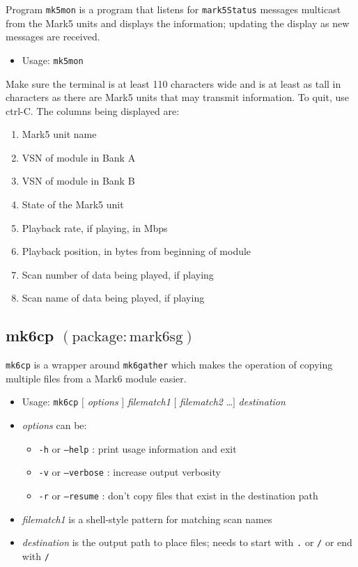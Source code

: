 Program {\tt mk5mon} is a program that listens for {\tt mark5Status} messages multicast from the Mark5 units and displays the information; updating the display as new messages are received.

\begin{itemize}
\item[] Usage: {\tt mk5mon}
\end{itemize}

Make sure the terminal is at least 110 characters wide and is at least as tall in characters as there are Mark5 units that may transmit information.
To quit, use ctrl-C.
The columns being displayed are:
\begin{enumerate}
\item Mark5 unit name
\item VSN of module in Bank A
\item VSN of module in Bank B
\item State of the Mark5 unit
\item Playback rate, if playing, in Mbps
\item Playback position, in bytes from beginning of module
\item Scan number of data being played, if playing
\item Scan name of data being played, if playing
\end{enumerate}




\subsection{mk6cp {\small $\mathrm{(package: mark6sg)}$} \label{sec:mk6cp}}

{\tt mk6cp} is a wrapper around {\tt mk6gather} which makes the operation of copying multiple files from a Mark6 module easier.

\begin{itemize}
\item[] Usage: {\tt mk6cp} $[$ {\em options} $]$ {\em filematch1} $[$ {\em filematch2} \ldots $]$ {\em destination}
\item[] {\em options} can be:
\begin{itemize}
\item[] {\tt -h} or {\tt --help} : print usage information and exit
\item[] {\tt -v} or {\tt --verbose} : increase output verbosity
\item[] {\tt -r} or {\tt --resume} : don't copy files that exist in the destination path
\end{itemize}
\item[] {\em filematch1} is a shell-style pattern for matching scan names
\item[] {\em destination} is the output path to place files; needs to start with {\tt .} or {\tt /} or end with {\tt /}  
\end{itemize}




